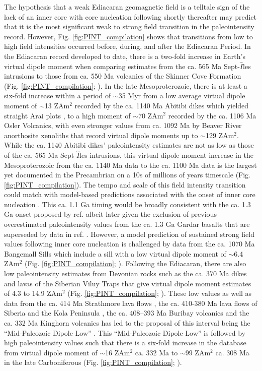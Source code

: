 \documentclass[9pt,twocolumn,twoside,lineno]{pnas-new}
\begin{document}
The hypothesis that a weak Ediacaran geomagnetic field is a telltale sign of the lack of an inner core with core nucleation following shortly thereafter may predict that it is the most significant weak to strong field transition in the paleointensity record. However, Fig. \ref{fig:PINT_compilation} shows that transitions from low to high field intensities occurred before, during, and after the Ediacaran Period. In the Ediacaran record developed to date, there is a two-fold increase in Earth's virtual dipole moment when comparing estimates from the ca. 565 Ma Sept-$\hat{I}$les intrusions \cite{Bono2019a} to those from ca. 550 Ma volcanics of the Skinner Cove Formation (Fig. \ref{fig:PINT_compilation}; \citealp{Thallner2021a}). In the late Mesoproterozoic, there is at least a six-fold increase within a period of $\sim$35 Myr from a low average virtual dipole moment of $\sim$13 ZAm$^2$ recorded by the ca. 1140 Ma Abitibi dikes which yielded straight Arai plots \cite{Macouin2003a}, to a high moment of $\sim$70 ZAm$^2$ recorded by the ca. 1106 Ma Osler Volcanics, with even stronger values from ca. 1092 Ma by Beaver River anorthosite xenoliths that record virtual dipole moments up to $\sim$129 ZAm$^2$. While the ca. 1140 Abitibi dikes' paleointensity estimates are not as low as those of the ca. 565 Ma Sept-$\hat{I}$les intrusions, this virtual dipole moment increase in the Mesoproterozoic from the ca. 1140 Ma data to the ca. 1100 Ma data is the largest yet documented in the Precambrian on a 10s of millions of years timescale (Fig. \ref{fig:PINT_compilation}). The tempo and scale of this field intensity transition could match with model-based predictions associated with the onset of inner core nucleation \cite{Davies2021a}. This ca. 1.1 Ga timing would be broadly consistent with the ca. 1.3 Ga onset proposed by ref. \citealp{Biggin2015a} albeit later given the exclusion of previous overestimated paleointensity values from the ca. 1.3 Ga Gardar basalts that are superseded by data in ref. \citealp{Kodama2019a}. However, a model prediction of sustained strong field values following inner core nucleation is challenged by data from the ca. 1070 Ma Bangemall Sills which include a sill with a low virtual dipole moment of $\sim$6.4 ZAm$^2$ (Fig. \ref{fig:PINT_compilation};  \citealp{Lloyd2021b}). Following the Ediacaran, there are also low paleointensity estimates from Devonian rocks such as the ca. 370 Ma dikes and lavas of the Siberian Viluy Traps that give virtual dipole moment estimates of 4.3 to 14.9 ZAm$^2$ (Fig. \ref{fig:PINT_compilation}; \citealp{Hawkins2019a}). These low values as well as data from the ca. 414 Ma Strathmore lava flows \cite{Hawkins2021a}, the ca. 410-380 Ma lava flows of Siberia and the Kola Peninsula \cite{Shcherbakova2017a}, the ca. 408–393 Ma Buribay volcanics \cite{Shcherbakova2021a} and the ca. 332 Ma Kinghorn volcanics \cite{Hawkins2021a} has led to the proposal of this interval being the ``Mid-Paleozoic Dipole Low'' \cite{Hawkins2021a}. This ``Mid-Paleozoic Dipole Low'' is followed by high paleointensity values such that there is a six-fold increase in the database from virtual dipole moment of $\sim$16 ZAm$^2$ ca. 332 Ma to $\sim$99 ZAm$^2$ ca. 308 Ma in the late Carboniferous (Fig. \ref{fig:PINT_compilation}; \citealp{Hawkins2021a}). 
\end{document}
